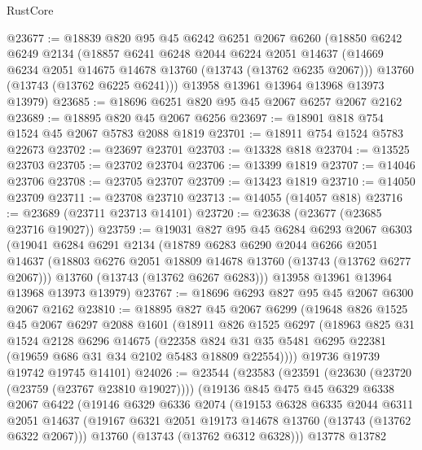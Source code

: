 \begin{lexlean}{RustCore}
\begin{coremodule}
@23677 := @18839
    @820
    @95
    @45
    @6242
    @6251
    @2067
    @6260
    (@18850
      @6242
      @6249
      @2134
      (@18857
        @6241
        @6248
        @2044
        @6224
        @2051
        @14637
        (@14669 @6234 @2051 @14675 @14678 @13760 (@13743 (@13762 @6235 @2067)))
        @13760
        (@13743 (@13762 @6225 @6241)))
      @13958
      @13961
      @13964
      @13968
      @13973
      @13979)
@23685 := @18696 @6251 @820 @95 @45 @2067 @6257 @2067 @2162
@23689 := @18895 @820 @45 @2067 @6256
@23697 := @18901 @818 @754 @1524 @45 @2067 @5783 @2088 @1819
@23701 := @18911 @754 @1524 @5783 @22673
@23702 := @23697 @23701
@23703 := @13328 @818
@23704 := @13525 @23703
@23705 := @23702 @23704
@23706 := @13399 @1819
@23707 := @14046 @23706
@23708 := @23705 @23707
@23709 := @13423 @1819
@23710 := @14050 @23709
@23711 := @23708 @23710
@23713 := @14055 (@14057 @818)
@23716 := @23689 (@23711 @23713 @14101)
@23720 := @23638 (@23677 (@23685 @23716 @19027))
@23759 := @19031
    @827
    @95
    @45
    @6284
    @6293
    @2067
    @6303
    (@19041
      @6284
      @6291
      @2134
      (@18789
        @6283
        @6290
        @2044
        @6266
        @2051
        @14637
        (@18803 @6276 @2051 @18809 @14678 @13760 (@13743 (@13762 @6277 @2067)))
        @13760
        (@13743 (@13762 @6267 @6283)))
      @13958
      @13961
      @13964
      @13968
      @13973
      @13979)
@23767 := @18696 @6293 @827 @95 @45 @2067 @6300 @2067 @2162
@23810 := @18895
    @827
    @45
    @2067
    @6299
    (@19648
      @826
      @1525
      @45
      @2067
      @6297
      @2088
      @1601
      (@18911
        @826
        @1525
        @6297
        (@18963
          @825
          @31
          @1524
          @2128
          @6296
          @14675
          (@22358 @824 @31 @35 @5481 @6295 @22381 (@19659 @686 @31 @34 @2102 @5483 @18809 @22554))))
      @19736
      @19739
      @19742
      @19745
      @14101)
@24026 := @23544
    (@23583
      (@23591
        (@23630 (@23720 (@23759 (@23767 @23810 @19027))))
        (@19136
          @845
          @475
          @45
          @6329
          @6338
          @2067
          @6422
          (@19146
            @6329
            @6336
            @2074
            (@19153
              @6328
              @6335
              @2044
              @6311
              @2051
              @14637
              (@19167 @6321 @2051 @19173 @14678 @13760 (@13743 (@13762 @6322 @2067)))
              @13760
              (@13743 (@13762 @6312 @6328)))
            @13778
            @13782

\end{coremodule}
\end{lexlean}
